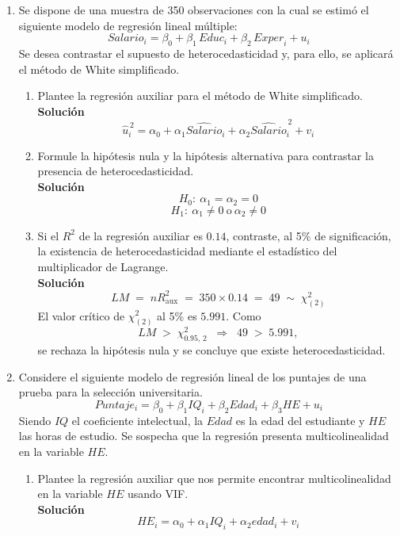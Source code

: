 \documentclass[10pt,a4paper]{article}
\begin{document}
\begin{enumerate}

\item Se dispone de una muestra de 350 observaciones con la cual se estimó el siguiente modelo de regresión lineal múltiple:
$$Salario_i = \beta_0 + \beta_1\,\textit{Educ}_i + \beta_2\,\textit{Exper}_i + u_i$$
Se desea contrastar el supuesto de heterocedasticidad y, para ello, se aplicará el método de White simplificado.
\begin{enumerate}
    \item  Plantee la regresión auxiliar para el método de White simplificado.\\
   {\color{blue} \textbf{Solución}\\
    $$\hat{u}_i^{\,2} = \alpha_0 + \alpha_1 \hat{Salario}_i + \alpha_2 \hat{Salario}_i^{\,2} + v_i$$}
    
    \item  Formule la hipótesis nula y la hipótesis alternativa para contrastar la presencia de heterocedasticidad.\\
    {\color{blue}\textbf{Solución}\\
    $$H_0:\ \alpha_1 = \alpha_2 = 0$$
    $$H_1:\ \alpha_1 \neq 0 \ \text{o}\ \alpha_2 \neq 0$$}
    
    \item  Si el $R^2$ de la regresión auxiliar es $0.14$, contraste, al 5\% de significación, la existencia de heterocedasticidad mediante el estadístico del multiplicador de Lagrange.\\
    {\color{blue}\textbf{Solución}\\
    $$LM \;=\; n R^2_{\text{aux}} \;=\; 350 \times 0.14 \;=\; 49 \;\sim\; \chi^2_{(2)}$$
    El valor crítico de $\chi^2_{(2)}$ al 5\% es $5.991$. Como
    $$LM \;>\; \chi^2_{0.95,\,2} \;\; \Longrightarrow \;\; 49 \;>\; 5.991,$$
    se rechaza la hipótesis nula y se concluye que existe heterocedasticidad.}
\end{enumerate}

\item  Considere el siguiente modelo de regresión lineal  de los puntajes de una prueba para la selección universitaria.
$$Puntaje_i = \beta_0 + \beta_1 IQ_i + \beta_2 Edad_i + \beta_3 HE+u_i$$
Siendo $IQ$ el coeficiente intelectual, la $Edad$ es la edad del estudiante y $HE$ las horas de estudio. Se sospecha que la regresión presenta multicolinealidad en la variable $HE$. 

\begin{enumerate}
    \item   Plantee la regresión auxiliar que nos permite encontrar multicolinealidad en la variable $HE$ usando VIF. \\
{\color{blue}\textbf{Solución}
$$HE_i = \alpha_0+ \alpha_1 IQ_i + \alpha_2 edad_i + v_i$$}


\end{enumerate}
\end{enumerate}
\end{document}
